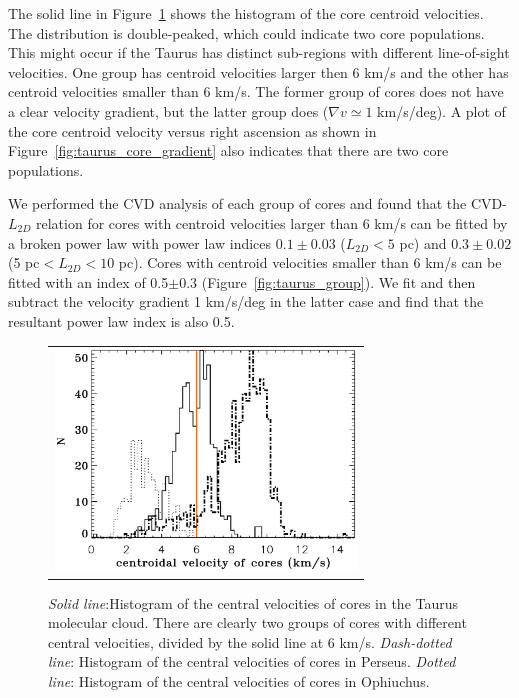 \documentclass[iop,revtex4]{emulateapj}
\begin{document}
The solid line in Figure~\ref{histvelocity_all} shows the histogram of the core centroid velocities. The distribution is double-peaked, which could indicate two core populations. This might occur if the Taurus has distinct sub-regions with different line-of-sight velocities. One group has centroid velocities larger then 6 km/s and the other has centroid velocities smaller than 6 km/s. The former group of cores does not have a clear velocity gradient, but the latter group does ($\nabla v\simeq 1$ km/s/deg). A plot of the core centroid velocity versus right ascension as shown in Figure~\ref{fig:taurus_core_gradient} also indicates that there are two core populations.

We performed the CVD analysis of each group of cores and found that the CVD-$L_{2D}$ relation for cores with centroid velocities larger than 6 km/s can be fitted by a broken power law with power law indices $0.1\pm 0.03$ ($L_{2D}<5$ pc) and $0.3\pm 0.02$ (5 pc$<L_{2D}<10$ pc).
Cores with centroid velocities smaller than 6 km/s can be fitted with an index of 0.5$\pm$0.3 (Figure~\ref{fig:taurus_group}). We fit and then subtract the velocity gradient 1 km/s/deg in the latter case and find that the resultant power law index is also 0.5.





\begin{figure}[htbp]
\centering
\begin{tabular}{c}
\includegraphics[width=8cm]{histvelocity_all.eps}\\
\end{tabular}
\caption{{\it Solid line}:Histogram of the central velocities of cores in the Taurus molecular cloud. There are clearly two groups of cores with different central velocities, divided by the solid line at 6 km/s. {\it Dash-dotted line}: Histogram of the central velocities of cores in Perseus. {\it Dotted line}: Histogram of the central velocities of cores in Ophiuchus.\label{histvelocity_all}}
\end{figure}
\end{document}
